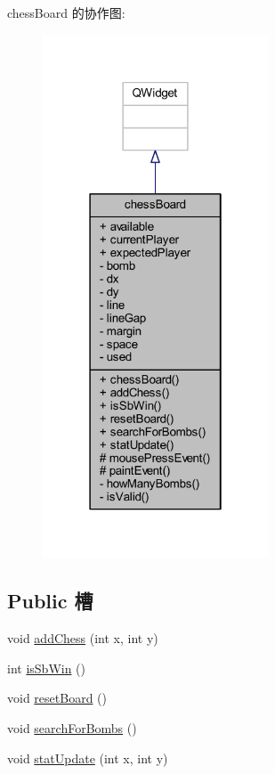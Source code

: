 chess\+Board 的协作图\+:
\nopagebreak
\begin{figure}[H]
\begin{center}
\leavevmode
\includegraphics[width=190pt]{d5/db3/classchess_board__coll__graph}
\end{center}
\end{figure}
\subsection*{Public 槽}
\begin{DoxyCompactItemize}
\item 
void \hyperlink{classchess_board_a3a0e6a43b6ffd6f08a8a3b34fb5f9a5e_a3a0e6a43b6ffd6f08a8a3b34fb5f9a5e}{add\+Chess} (int x, int y)
\item 
int \hyperlink{classchess_board_a27433f6de7e03bdcb82a247a75e61ef2_a27433f6de7e03bdcb82a247a75e61ef2}{is\+Sb\+Win} ()
\item 
void \hyperlink{classchess_board_a685a53f93b9701359ba5d0bce447fef5_a685a53f93b9701359ba5d0bce447fef5}{reset\+Board} ()
\item 
void \hyperlink{classchess_board_aeed35797ed849bf9ac7527a0fb8e13a9_aeed35797ed849bf9ac7527a0fb8e13a9}{search\+For\+Bombs} ()
\item 
void \hyperlink{classchess_board_ac154f5bf7454a18b79a79af82aa700e5_ac154f5bf7454a18b79a79af82aa700e5}{stat\+Update} (int x, int y)
\end{DoxyCompactItemize}

